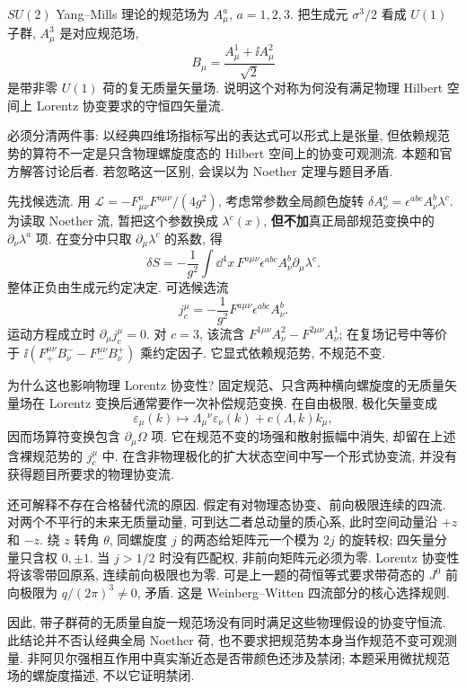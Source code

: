 \begin{exercise}
$SU(2)$ Yang--Mills 理论的规范场为 $A^a_\mu$, $a=1,2,3$. 把生成元 $\sigma^3/2$ 看成 $U(1)$ 子群, $A^3_\mu$ 是对应规范场,
\[
B_\mu=\frac{A^1_\mu+\ii A^2_\mu}{\sqrt2}
\]
是带非零 $U(1)$ 荷的复无质量矢量场. 说明这个对称为何没有满足物理 Hilbert 空间上 Lorentz 协变要求的守恒四矢量流.
\end{exercise}
\begin{solution}
必须分清两件事: 以经典四维场指标写出的表达式可以形式上是张量, 但依赖规范势的算符不一定是只含物理螺旋度态的 Hilbert 空间上的协变可观测流. 本题和官方解答讨论后者. 若忽略这一区别, 会误以为 Noether 定理与题目矛盾.

先找候选流. 用 $\mathcal L=-F^a_{\mu\nu}F^{a\mu\nu}/(4g^2)$, 考虑常参数全局颜色旋转 $\delta A^a_\nu=\epsilon^{abc}A^b_\nu\lambda^c$. 为读取 Noether 流, 暂把这个参数换成 $\lambda^c(x)$, \textbf{但不加}真正局部规范变换中的 $\partial_\nu\lambda^a$ 项. 在变分中只取 $\partial_\mu\lambda^c$ 的系数, 得
\[
\delta S=-\frac1{g^2}\int\dd^4x\,
F^{a\mu\nu}\epsilon^{abc}A^b_\nu\partial_\mu\lambda^c.
\]
整体正负由生成元约定决定. 可选候选流
\[
j_c^\mu=-\frac1{g^2}F^{a\mu\nu}\epsilon^{abc}A^b_\nu.
\]
运动方程成立时 $\partial_\mu j_c^\mu=0$. 对 $c=3$, 该流含 $F^{1\mu\nu}A^2_\nu-F^{2\mu\nu}A^1_\nu$; 在复场记号中等价于 $\ii(F_+^{\mu\nu}B^-_\nu-F_-^{\mu\nu}B^+_\nu)$ 乘约定因子. 它显式依赖规范势, 不规范不变.

为什么这也影响物理 Lorentz 协变性? 固定规范、只含两种横向螺旋度的无质量矢量场在 Lorentz 变换后通常要作一次补偿规范变换. 在自由极限, 极化矢量变成
\[
\varepsilon_\mu(k)\longmapsto
\Lambda_\mu{}^\nu\varepsilon_\nu(k)+c(\Lambda,k)k_\mu,
\]
因而场算符变换包含 $\partial_\mu\Omega$ 项. 它在规范不变的场强和散射振幅中消失, 却留在上述含裸规范势的 $j_c^\mu$ 中. 在含非物理极化的扩大状态空间中写一个形式协变流, 并没有获得题目所要求的物理协变流.

还可解释不存在合格替代流的原因. 假定有对物理态协变、前向极限连续的四流. 对两个不平行的未来无质量动量, 可到达二者总动量的质心系, 此时空间动量沿 $+z$ 和 $-z$. 绕 $z$ 转角 $\theta$, 同螺旋度 $j$ 的两态给矩阵元一个模为 $2j$ 的旋转权; 四矢量分量只含权 $0,\pm1$. 当 $j>1/2$ 时没有匹配权, 非前向矩阵元必须为零. Lorentz 协变性将该零带回原系, 连续前向极限也为零. 可是上一题的荷恒等式要求带荷态的 $J^0$ 前向极限为 $q/(2\pi)^3\ne0$, 矛盾. 这是 Weinberg--Witten 四流部分的核心选择规则.

因此, 带子群荷的无质量自旋一规范场没有同时满足这些物理假设的协变守恒流. 此结论并不否认经典全局 Noether 荷, 也不要求把规范势本身当作规范不变可观测量. 非阿贝尔强相互作用中真实渐近态是否带颜色还涉及禁闭; 本题采用微扰规范场的螺旋度描述, 不以它证明禁闭.
\end{solution}

